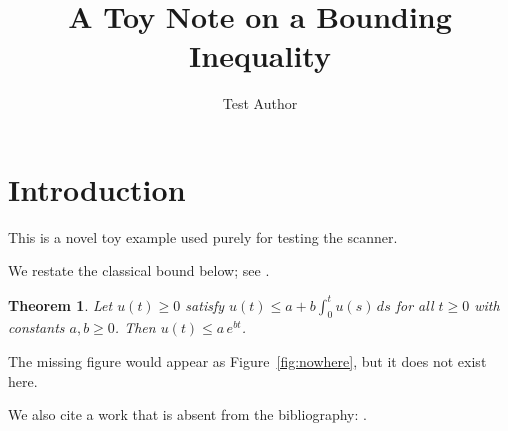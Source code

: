\documentclass{article}
\newtheorem{theorem}{Theorem}
\begin{document}
\title{A Toy Note on a Bounding Inequality}
\author{Test Author}
\maketitle

\section{Introduction}
This is a novel toy example used purely for testing the scanner.

We restate the classical bound below; see \cite{smith2019}.

\begin{theorem}
\label{thm:main}
Let $u(t) \ge 0$ satisfy $u(t) \le a + b \int_0^t u(s)\,ds$ for all $t \ge 0$
with constants $a, b \ge 0$. Then $u(t) \le a\, e^{b t}$.
\end{theorem}

The missing figure would appear as Figure~\ref{fig:nowhere}, but it does not
exist here.

We also cite a work that is absent from the bibliography: \cite{ghost2020}.


\end{document}
